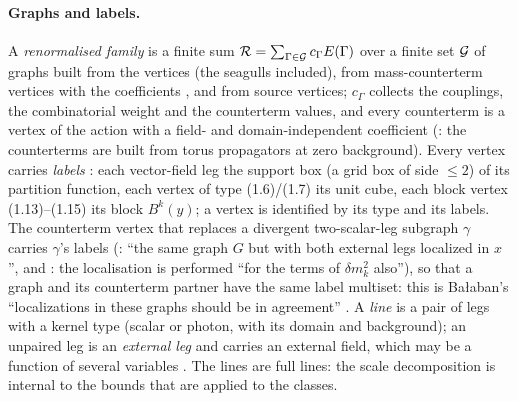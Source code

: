 \paragraph{Graphs and labels.} A \emph{renormalised family} is a finite sum $\mathcal R=\sum_{\Gamma\in\mathcal G}c_\Gamma E(\Gamma)$ over a finite set $\mathcal G$ of graphs built from the vertices \cite[(1.6)--(1.15)]{Ba3} (the seagulls included), from mass-counterterm vertices \cite[(1.7)]{Ba3} with the coefficients \cite[(1.23), (1.29)]{Ba3}, and from source vertices; $c_\Gamma$ collects the couplings, the combinatorial weight and the counterterm values, and every counterterm is a vertex of the action with a field- and domain-independent coefficient (\cite[(1.29)--(1.31), p.~419]{Ba3}: the counterterms are built from torus propagators at zero background). Every vertex carries \emph{labels} \cite[p.~420]{Ba3}: each vector-field leg the support box (a grid box of side $\le2$) of its partition function, each vertex of type (1.6)/(1.7) its unit cube, each block vertex (1.13)--(1.15) its block $B^k(y)$; a vertex is identified by its type and its labels. The counterterm vertex that replaces a divergent two-scalar-leg subgraph $\gamma$ carries $\gamma$'s labels (\cite[p.~417]{Ba3}: ``the same graph $G$ but with both external legs localized in $x$'', and \cite[p.~420]{Ba3}: the localisation is performed ``for the terms of $\delta m^2_k$ also''), so that a graph and its counterterm partner have the same label multiset: this is Ba{\l}aban's ``localizations in these graphs should be in agreement'' \cite[p.~432]{Ba3}. A \emph{line} is a pair of legs with a kernel type (scalar or photon, with its domain and background); an unpaired leg is an \emph{external leg} and carries an external field, which may be a function of several variables \cite[p.~419]{Ba3}. The lines are full lines: the scale decomposition is internal to the bounds that are applied to the classes.

